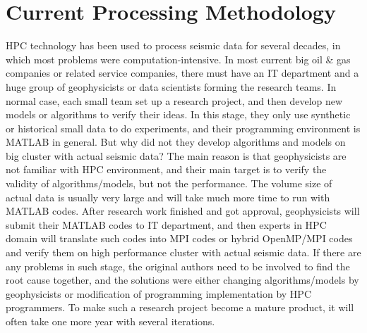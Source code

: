 

\section{Current Processing Methodology}
HPC technology has been used to process seismic data for several decades, in which most problems were computation-intensive. In most current big oil \& gas companies or related service companies, there must have an IT department and a huge group of geophysicists or data scientists forming the research teams. In normal case, each small team set up a research project, and then develop new models or algorithms to verify their ideas. In this stage, they only use synthetic or historical small data to do experiments, and their programming environment is MATLAB in general. But why did not they develop algorithms and models on big cluster with actual seismic data? The main reason is that geophysicists are not familiar with HPC environment, and their main target is to verify the validity of algorithms/models, but not the performance. The volume size of actual data is usually very large and will take much more time to run with MATLAB codes. After research work finished and got approval, geophysicists will submit their MATLAB codes to IT department, and then experts in HPC domain will translate such codes into MPI codes or hybrid OpenMP/MPI codes and verify them on high performance cluster with actual seismic data. If there are any problems in such stage, the original authors need to be involved to find the root cause together, and the solutions were either changing algorithms/models by geophysicists or modification of programming implementation by HPC programmers. To make such a research project become a mature product, it will often take one more year with several iterations.



